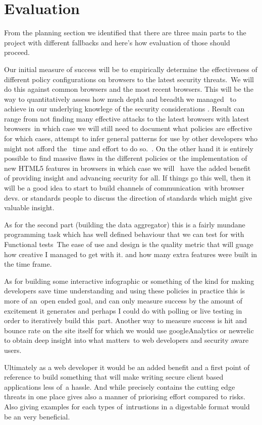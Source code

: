 \chapter{Evaluation}

From the planning section we identified that there are three main parts to the project with different fallbacks and here's how evaluation of those should proceed.\

Our initial measure of success will be to empirically determine the effectiveness of different policy configurations on browsers to the latest security threats.\
We will do this against common browsers and the most recent browsers. This will be the way to quantitatively assess how much depth and breadth we managed \
to achieve in our underlying knowlege of the security considerations . Result can range from not finding many effective attacks to the latest browsers with latest browsers\
in which case we will still need to document what policies are effective for which cases, attempt to infer general patterns for use by other developers who might not afford the \
time and effort to do so.\ .
On the other hand it is entirely possible to find massive flaws in the different policies or the implementation of new HTML5 features in browsers in which case we will \
have the added benefit of providing insight and advancing security for all. If things go this well, then it will be a good idea to start to build channels of communication\
with browser devs. or standards people to discuss the direction of standards which might give valuable insight.\

As for the second part (building the data aggregator) this is a fairly mundane programming task which has well defined behaviour that we can test for with Functional tests\
The ease of use and design is the quality metric that will guage how creative I managed to get with it. and how many extra features were built in the time frame.\

As for building some interactive infographic or something of the kind for making developers save time understanding and using these policies in practice this is more of an\
open ended goal, and can only measure success by the amount of excitement it generates and perhaps I could do with polling or live testing in order to iteratively build this\
part. Another way to measure success is hit and bounce rate on the site itself for which we would use googleAnalytics or newrelic to obtain deep insight into what matters\
to web developers and security aware users.\

Ultimately as a web developer it would be an added benefit and a first point of reference to build something that will make writing secure client based applications less of\
a hassle. And while precisely contains the cutting edge threats in one place gives also a manner of priorising effort compared to risks. Also giving examples for each types of\
intrustions in a digestable format would be an very beneficial.\

